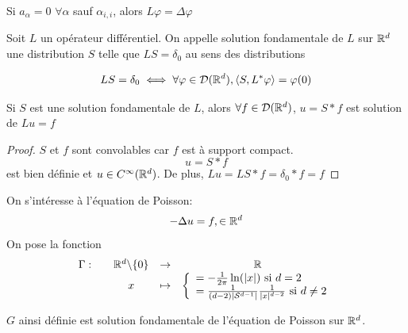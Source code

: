 \documentclass[]{report}
\begin{document}
    \begin{ex}{}{}
        Si $a_\alpha=0$ $\forall \alpha$ sauf $\alpha_{i,i}$, alors $L\varphi=\Delta \varphi$
    \end{ex}

    \begin{df}{}{}
        Soit $L$ un opérateur différentiel. On appelle solution fondamentale de $L$ sur $\mathbb{R}^d$ une distribution $S$ telle que $LS=\delta_0$ au sens des distributions
    \end{df}

    \begin{re}{}{}
        \[LS=\delta_0\iff \forall \varphi\in \mathcal{D}(\mathbb{R}^d),\langle S,L^*\varphi \rangle=\varphi(0)\]
    \end{re}

    \begin{prop}{}{}
        Si $S$ est une solution fondamentale de $L$, alors $\forall f\in\mathcal{D}(\mathbb{R}^d)$, $u=S*f$ est solution de $Lu=f$
    \end{prop}

    \begin{proof}
        $S$ et $f$ sont convolables car $f$ est à support compact.
        \[u=S*f\]
        est bien définie et $u\in C^{\infty}(\mathbb{R}^d)$. De plus, $Lu=LS*f=\delta_0*f=f$
    \end{proof}

    On s'intéresse à l'équation de Poisson:
    \[-\Delta u=f,\in \mathbb{R}^d\]
    On pose la fonction
    \[\begin{array}{ccccc} \Gamma : & & \mathbb{R}^d\backslash\{0\} & \to & \mathbb{R} \\ & & x & \mapsto & \left\{\begin{array}{ll} =-\frac{1}{2\pi}\ln(|x|)\text{ si $d=2$}\\ =\frac{1}{(d-2)|\mathcal{S}^{d-1}|}\frac{1}{|x|^{d-2}}\text{ si $d\neq 2$} \end{array} \right. \end{array}\]
    
    \begin{prop}{}{}
        $G$ ainsi définie est solution fondamentale de l'équation de Poisson sur $\mathbb{R}^d$.
    \end{prop}
\end{document}

